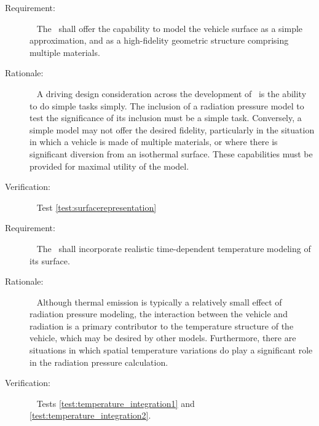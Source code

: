 \label{reqt:surfacerepresentation}
\begin{description}
  \item[Requirement:]\ \newline
     The \RadiationPressureDesc\ shall offer the capability to model the vehicle surface
as a simple approximation, and as a high-fidelity geometric structure comprising multiple materials.

  \item[Rationale:]\ \newline
     A driving design consideration across the development of
	  \JEODid\ is the ability to do
simple tasks simply.  The inclusion of a radiation pressure model to test the significance of
its inclusion must be a simple task.  Conversely, a simple model may not offer the desired
fidelity, particularly in the situation in which a vehicle is made of multiple materials, or where
there is significant diversion from an isothermal surface.  These capabilities must be provided
for maximal utility of the model.

  \item[Verification:]\ \newline
     Test \vref{test:surfacerepresentation}
\end{description}


\label{reqt:temperaturestructure}
\begin{description}
  \item[Requirement:]\ \newline
     The \RadiationPressureDesc\ shall incorporate realistic time-dependent
temperature modeling of its surface.

  \item[Rationale:]\ \newline
     Although thermal emission is typically a relatively small effect of radiation
     pressure modeling, the interaction between the vehicle and radiation is a
     primary contributor to the temperature structure of the vehicle, which may be
     desired by other models.  Furthermore, there are situations in which spatial
     temperature variations do play a significant role in the radiation pressure calculation.

  \item[Verification:]\ \newline
     Tests \vref{test:temperature_integration1} and \vref{test:temperature_integration2}.
\end{description}


